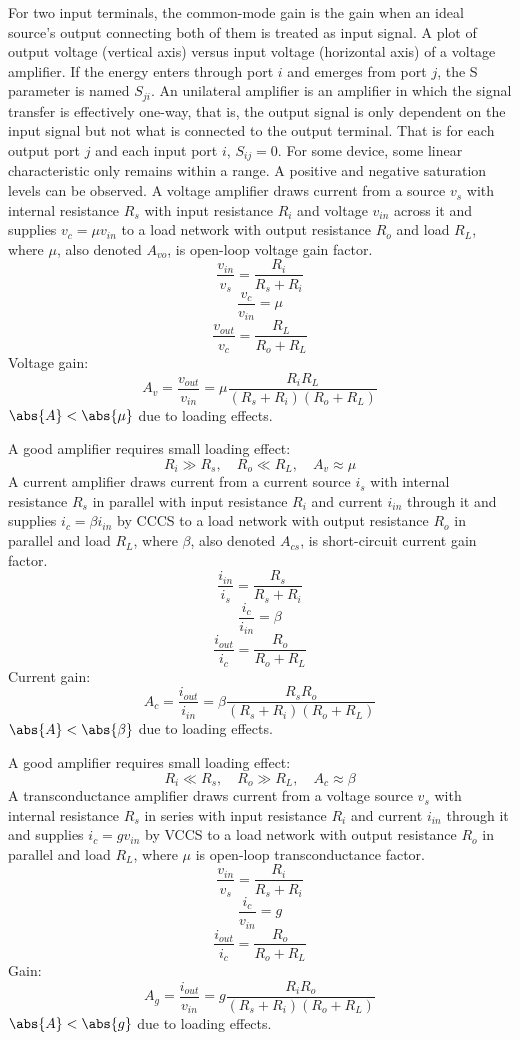 \documentclass[a4paper,12pt]{report}
\begin{document}
For two input terminals, the common-mode gain is the gain when an ideal source's output connecting both of them is treated as input signal.
A plot of output voltage (vertical axis) versus input voltage (horizontal axis) of a voltage amplifier.
If the energy enters through port $i$ and emerges from port $j$, the S parameter is named $S_{ji}$.
An unilateral amplifier is an amplifier in which the signal transfer is effectively one-way, that is, the output signal is only dependent on the input signal but not what is connected to the output terminal. That is for each output port $j$ and each input port $i$, $S_{ij}=0$.
For some device, some linear characteristic only remains within a range. A positive and negative saturation levels can be observed.
A voltage amplifier draws current from a source $v_s$ with internal resistance $R_s$ with input resistance $R_i$ and voltage $v_{in}$ across it and supplies $v_c=\mu v_{in}$ to a load network with output resistance $R_o$ and load $R_L$, where $\mu$, also denoted $A_{vo}$, is open-loop voltage gain factor.
\[\frac{v_{in}}{v_s}=\frac{R_i}{R_s+R_i}\]
\[\frac{v_c}{v_{in}}=\mu\]
\[\frac{v_{out}}{v_c}=\frac{R_L}{R_o+R_L}\]
Voltage gain:
\[A_v=\frac{v_{out}}{v_{in}}=\mu\frac{R_iR_L}{(R_s+R_i)(R_o+R_L)}\]
$\abs{A}<\abs{\mu}$ due to loading effects.

A good amplifier requires small loading effect:
\[R_i\gg R_s,\quad R_o\ll R_L,\quad A_v\approx\mu\]
A current amplifier draws current from a current source $i_s$ with internal resistance $R_s$ in parallel with input resistance $R_i$ and current $i_{in}$ through it and supplies $i_c=\beta i_{in}$ by CCCS to a load network with output resistance $R_o$ in parallel and load $R_L$, where $\beta$, also denoted $A_{cs}$, is short-circuit current gain factor.
\[\frac{i_{in}}{i_s}=\frac{R_s}{R_s+R_i}\]
\[\frac{i_c}{i_{in}}=\beta\]
\[\frac{i_{out}}{i_c}=\frac{R_o}{R_o+R_L}\]
Current gain:
\[A_c=\frac{i_{out}}{i_{in}}=\beta\frac{R_sR_o}{(R_s+R_i)(R_o+R_L)}\]
$\abs{A}<\abs{\beta}$ due to loading effects.

A good amplifier requires small loading effect:
\[R_i\ll R_s,\quad R_o\gg R_L,\quad A_c\approx\beta\]
A transconductance amplifier draws current from a voltage source $v_s$ with internal resistance $R_s$ in series with input resistance $R_i$ and current $i_{in}$ through it and supplies $i_c=gv_{in}$ by VCCS to a load network with output resistance $R_o$ in parallel and load $R_L$, where $\mu$ is open-loop transconductance factor.
\[\frac{v_{in}}{v_s}=\frac{R_i}{R_s+R_i}\]
\[\frac{i_c}{v_{in}}=g\]
\[\frac{i_{out}}{i_c}=\frac{R_o}{R_o+R_L}\]
Gain:
\[A_g=\frac{i_{out}}{v_{in}}=g\frac{R_iR_o}{(R_s+R_i)(R_o+R_L)}\]
$\abs{A}<\abs{g}$ due to loading effects.
\end{document}
